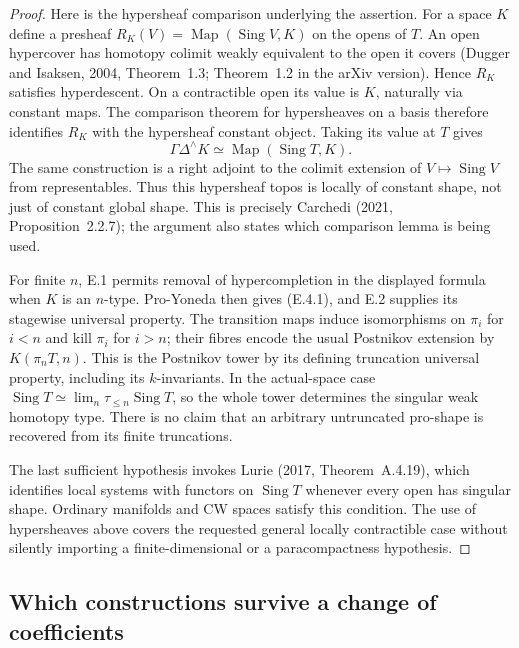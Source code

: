 \begin{proof}
Here is the hypersheaf comparison underlying the assertion. For a space $K$ define a presheaf
$R_K(V)=\operatorname{Map}(\operatorname{Sing}V,K)$ on the opens of $T$. An open hypercover has homotopy colimit weakly equivalent to the open it covers (Dugger and Isaksen, 2004, Theorem~1.3; Theorem~1.2 in the arXiv version). Hence $R_K$ satisfies hyperdescent. On a contractible open its value is $K$, naturally via constant maps. The comparison theorem for hypersheaves on a basis therefore identifies $R_K$ with the hypersheaf constant object. Taking its value at $T$ gives
\[
 \Gamma\Delta^\wedge K\simeq
                   \operatorname{Map}(\operatorname{Sing}T,K).
\]
The same construction is a right adjoint to the colimit extension of $V\mapsto\operatorname{Sing}V$ from representables. Thus this hypersheaf topos is locally of constant shape, not just of constant global shape. This is precisely Carchedi (2021, Proposition~2.2.7); the argument also states which comparison lemma is being used.

For finite $n$, E.1 permits removal of hypercompletion in the displayed formula when $K$ is an $n$-type. Pro-Yoneda then gives (E.4.1), and E.2 supplies its stagewise universal property. The transition maps induce isomorphisms on $\pi_i$ for $i<n$ and kill $\pi_i$ for $i>n$; their fibres encode the usual Postnikov extension by $K(\pi_nT,n)$. This is the Postnikov tower by its defining truncation universal property, including its $k$-invariants. In the actual-space case $\operatorname{Sing}T\simeq\lim_n\tau_{\le n}\operatorname{Sing}T$, so the whole tower determines the singular weak homotopy type. There is no claim that an arbitrary untruncated pro-shape is recovered from its finite truncations.

The last sufficient hypothesis invokes Lurie (2017, Theorem~A.4.19), which identifies local systems with functors on $\operatorname{Sing}T$ whenever every open has singular shape. Ordinary manifolds and CW spaces satisfy this condition. The use of hypersheaves above covers the requested general locally contractible case without silently importing a finite-dimensional or a paracompactness hypothesis. 
\end{proof}

\subsection{Which constructions survive a change of coefficients}

